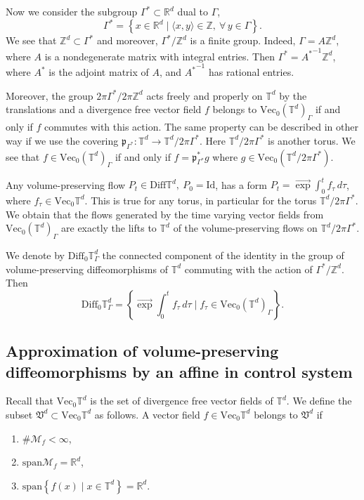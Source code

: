\documentclass[10pt]{article}
\newcommand{\R}{{\mathbb R}}
\newcommand{\T}{{\mathbb T}}
\newcommand{\Z}{{\mathbb Z}}
\newcommand{\M}{{\mathcal M}}
\newcommand{\Id}{\text{Id}}
\newcommand{\E}
{\overrightarrow{\exp}\int}
\begin{document}
Now we consider the subgroup $\Gamma^*\subset\R^d$ dual to $\Gamma$,
$$
\Gamma^*=\left\{x\in\R^d \mid \langle x,y\rangle\in\Z,\ \forall\,y\in\Gamma\right\}.
$$
We see that $\Z^d\subset\Gamma^*$ and moreover, $\Gamma^*/\Z^d$ is a finite group. Indeed, $\Gamma=A\Z^d$, where $A$ is a nondegenerate 
matrix with integral entries. Then $\Gamma^*={A^*}^{-1}\Z^d$, where $A^*$ is the adjoint matrix of $A$, and ${A^*}^{-1}$ has rational entries.

Moreover, the group $2\pi\Gamma^*/2\pi\Z^d$ acts freely and properly on $\T^d$ by the translations and a divergence free vector field $f$ belongs to
$\mathrm{Vec}_0(\T^d)_\Gamma$ if and only if $f$ commutes with this action. The same property can be described in other way if we use
the covering $\mathfrak p_{\Gamma^*}:\T^d\to \T^d/2\pi\Gamma^*$. Here $\T^d/2\pi\Gamma^*$ is another torus. We see that 
$f\in\mathrm{Vec}_0(\T^d)_\Gamma$ if and only if $f=\mathfrak p^*_{\Gamma^*}g$ where $g\in\mathrm{Vec}_0(\T^d/2\pi\Gamma^*)$.

Any volume-preserving flow $P_t\in\mathrm{Diff}\T^d,\ P_0=\Id$, has a form $P_t=\E_0^tf_\tau\,d\tau$, where $f_\tau\in\mathrm{Vec}_0\T^d$.
This is true for any torus, in particular for the torus $\T^d/2\pi\Gamma^*$. We obtain that the flows generated by the time varying vector fields
from $\mathrm{Vec}_0(\T^d)_\Gamma$ are exactly the lifts to $\T^d$ of the volume-preserving flows on $\T^d/2\pi\Gamma^*$.

We denote by $\mathrm{Diff}_0\T^d_\Gamma$ the connected component of the identity in the group of volume-preserving diffeomorphisms of $\T^d$
commuting with the action of $\Gamma^*/\Z^d$. Then
$$
\mathrm{Diff}_0\T^d_\Gamma=\left\{\E_0^tf_\tau\,d\tau \mid f_\tau\in\mathrm{Vec}_0(\T^d)_\Gamma\right\}.
$$

\subsection{Approximation of volume-preserving diffeomorphisms by an affine in control system}

Recall that $\mathrm{Vec}_0\T^d$ is the set of divergence free vector fields of $\T^d$. We define the subset $\mathfrak V^d\subset\mathrm{Vec}_0\T^d$ as follows. A vector field $f\in\mathrm{Vec}_0\T^d$ belongs to $\mathfrak V^d$ if
\begin{enumerate}
\item[(i)] $\#\M_f<\infty$,   
\item[(ii)] $\mathrm{span}\M_f=\R^d$,
\item[(iii)] $\mathrm{span}\left\{f(x) \mid x\in\T^d\right\}=\R^d$.
\end{enumerate}
\end{document}

